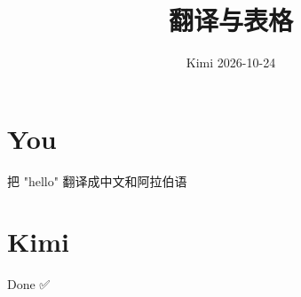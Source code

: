 \documentclass[11pt,a4paper]{article}
\title{翻译与表格}
\date{Kimi \textperiodcentered{} 2026-10-24}
\begin{document}
\maketitle

\section*{You}

把 "hello" 翻译成中文和阿拉伯语


\section*{Kimi}

\begin{center}
\end{center}

Done ✅
\end{document}
